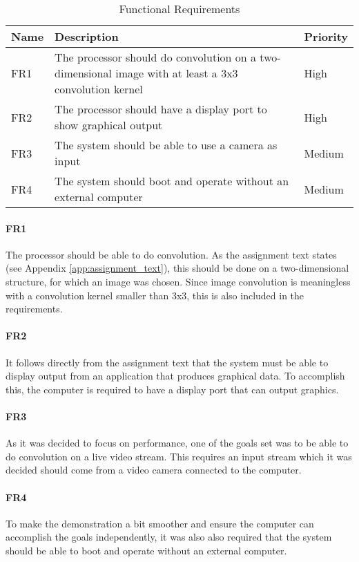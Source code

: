 \begin{table}[h]
    \centering
    \begin{tabular}{lp{12cm}l}
        Name & Description & Priority \\
        \hline
        FR1 &
            The processor should do convolution on a two-dimensional image with at least a 3x3 convolution kernel &
            High \\
        FR2 &
            The processor should have a display port to show graphical output &
            High \\
        FR3 &
            The system should be able to use a camera as input &
            Medium \\
        FR4 &
            The system should boot and operate without an external computer &
            Medium
    \end{tabular}
    \caption{Functional Requirements}
    \label{tab:FunctionalRequirements}
\end{table}

\paragraph{FR1}
The processor should be able to do convolution.
As the assignment text states (see Appendix \ref{app:assignment_text}), this should be done on a two-dimensional structure, for which an image was chosen.
Since image convolution is meaningless with a convolution kernel smaller than 3x3,
this is also included in the requirements.

\paragraph{FR2}
It follows directly from the assignment text that the system must be able to display output from an application that produces graphical data.
To accomplish this, the computer is required to have a display port that can output graphics.

\paragraph{FR3}
As it was decided to focus on performance, one of the goals set was to be able to do convolution on a live video stream.
This requires an input stream which it was decided should come from a video camera connected to the computer.

\paragraph{FR4}
To make the demonstration a bit smoother and ensure the computer can accomplish the goals independently, it was also also required that the system should be able to boot and operate without an external computer.

